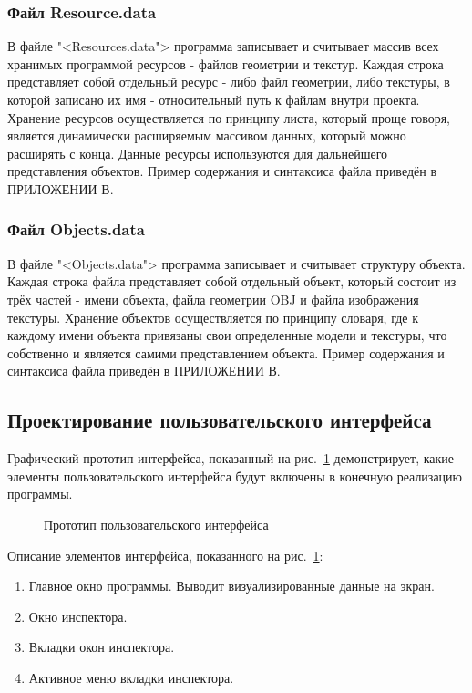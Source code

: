 \subsubsection{Файл Resource.data}

В файле "<Resources.data"> программа записывает и считывает массив всех хранимых программой ресурсов - файлов геометрии и текстур. Каждая строка представляет собой отдельный ресурс - либо файл геометрии, либо текстуры, в которой записано их имя - относительный путь к файлам внутри проекта. Хранение ресурсов осуществляется по принципу листа, который проще говоря, является динамически расширяемым массивом данных, который можно расширять с конца. Данные ресурсы используются для дальнейшего представления объектов. Пример содержания и синтаксиса файла приведён в ПРИЛОЖЕНИИ В.

\subsubsection{Файл Objects.data}

В файле "<Objects.data"> программа записывает и считывает структуру объекта. Каждая строка файла представляет собой отдельный объект, который состоит из трёх частей - имени объекта, файла геометрии OBJ и файла изображения текстуры. Хранение объектов осуществляется по принципу словаря, где к каждому имени объекта привязаны свои определенные модели и текстуры, что собственно и является самими представлением объекта. Пример содержания и синтаксиса файла приведён в ПРИЛОЖЕНИИ В.

\subsection{Проектирование пользовательского интерфейса}

Графический прототип интерфейса, показанный на рис.~\ref{maket2:image} демонстрирует, какие элементы пользовательского интерфейса будут включены в конечную реализацию программы.

\begin{figure}[H]
\caption{Прототип пользовательского интерфейса}
\label{maket2:image}
\end{figure}

Описание элементов интерфейса, показанного на рис.~\ref{maket2:image}:
\begin{enumerate}
	\item Главное окно программы. Выводит визуализированные данные на экран.
	\item Окно инспектора.
	\item Вкладки окон инспектора.
	\item Активное меню вкладки инспектора.
\end{enumerate}

